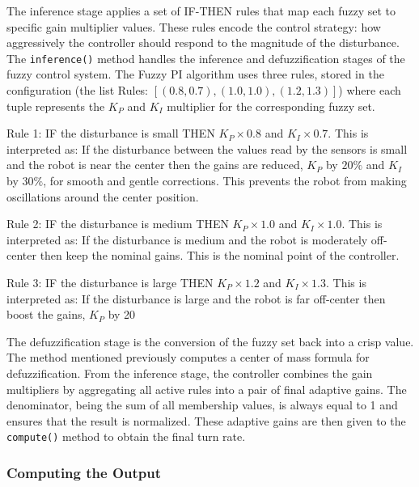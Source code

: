 The inference stage applies a set of IF-THEN rules that map each fuzzy set to specific gain multiplier values. These rules encode the control strategy: how aggressively the controller should respond to the magnitude of the disturbance. The \texttt{inference()} method handles the inference and defuzzification stages of the fuzzy control system. The Fuzzy PI algorithm uses three rules, stored in the configuration (the list Rules: $[(0.8, 0.7), (1.0, 1.0), (1.2, 1.3)]$) where each tuple represents the $K_P$ and $K_I$ multiplier for the corresponding fuzzy set.

Rule 1: IF the disturbance is small THEN $K_P \times 0.8$ and $K_I \times 0.7$. This is interpreted as: If the disturbance between the values read by the sensors is small and the robot is near the center then the gains are reduced, $K_P$ by $20\%$ and $K_I$ by $30\%$, for smooth and gentle corrections. This prevents the robot from making oscillations around the center position.

Rule 2: IF the disturbance is medium THEN $K_P \times 1.0$ and $K_I \times 1.0$. This is interpreted as: If the disturbance is medium and the robot is moderately off-center then keep the nominal gains. This is the nominal point of the controller. 

Rule 3: IF the disturbance is large THEN $K_P \times 1.2$ and $K_I \times 1.3$. This is interpreted as: If the disturbance is large and the robot is far off-center then boost the gains, $K_P$ by 20%

The defuzzification stage is the conversion of the fuzzy set back into a crisp value. The method mentioned previously computes a center of mass formula for defuzzification. From the inference stage, the controller combines the gain multipliers by aggregating all active rules into a pair of final adaptive gains. The denominator, being the sum of all membership values, is always equal to 1 and ensures that the result is normalized. These adaptive gains are then given to the \texttt{compute()} method to obtain the final turn rate. 

\subsubsection{Computing the Output}

